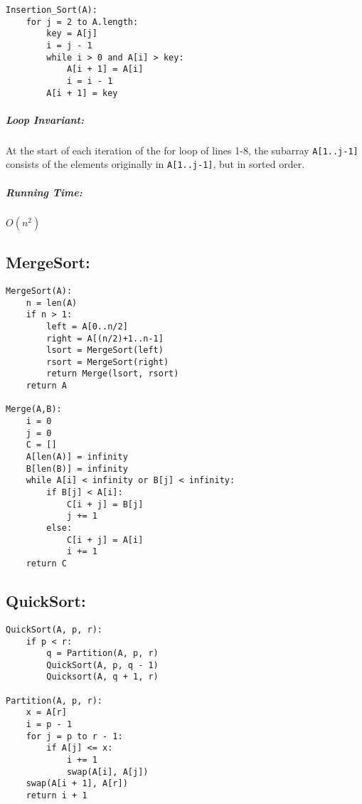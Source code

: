 \documentclass{article}
\newcommand{\code}[1]{\texttt{#1}}
\begin{document}
\begin{lstlisting}
Insertion_Sort(A):
    for j = 2 to A.length:
        key = A[j]
        i = j - 1
        while i > 0 and A[i] > key:
            A[i + 1] = A[i]
            i = i - 1
        A[i + 1] = key
\end{lstlisting}
\subparagraph{Loop Invariant:} At the start of each iteration of the for loop of lines 1-8, the subarray \code{A[1..j-1]} consists of the elements originally in \code{A[1..j-1]}, but in sorted order.

\subparagraph{Running Time:} \(O(n^2)\)

\subsection{MergeSort:}
\begin{lstlisting}
MergeSort(A):
    n = len(A)
    if n > 1:
        left = A[0..n/2]
        right = A[(n/2)+1..n-1]
        lsort = MergeSort(left)
        rsort = MergeSort(right)
        return Merge(lsort, rsort)
    return A

Merge(A,B):
    i = 0
    j = 0
    C = []
    A[len(A)] = infinity
    B[len(B)] = infinity
    while A[i] < infinity or B[j] < infinity:
        if B[j] < A[i]:
            C[i + j] = B[j]
            j += 1
        else:
            C[i + j] = A[i]
            i += 1
    return C
\end{lstlisting}

\subsection{QuickSort:}
\begin{lstlisting}
QuickSort(A, p, r):
    if p < r:
        q = Partition(A, p, r)
        QuickSort(A, p, q - 1)
        Quicksort(A, q + 1, r)

Partition(A, p, r):
    x = A[r]
    i = p - 1
    for j = p to r - 1:
        if A[j] <= x:
            i += 1
            swap(A[i], A[j])
    swap(A[i + 1], A[r])
    return i + 1
\end{lstlisting}
\end{document}
